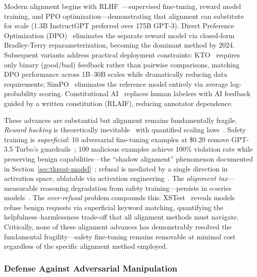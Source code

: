 Modern alignment begins with RLHF~\cite{ouyang2022rlhf}---supervised fine-tuning, reward model training, and PPO optimization---demonstrating that alignment can substitute for scale (1.3B InstructGPT preferred over 175B GPT-3). Direct Preference Optimization (DPO)~\cite{rafailov2023dpo} eliminates the separate reward model via closed-form Bradley-Terry reparameterization, becoming the dominant method by 2024. Subsequent variants address practical deployment constraints: KTO~\cite{ethayarajh2024kto} requires only binary (good/bad) feedback rather than pairwise comparisons, matching DPO performance across 1B--30B scales while dramatically reducing data requirements; SimPO~\cite{meng2024simpo} eliminates the reference model entirely via average log-probability scoring. Constitutional AI~\cite{bai2022constitutionalai} replaces human labelers with AI feedback guided by a written constitution (RLAIF), reducing annotator dependence.

These advances are substantial but alignment remains fundamentally fragile. \emph{Reward hacking} is theoretically inevitable~\cite{skalse2022rewardhacking} with quantified scaling laws~\cite{gao2023scalinglaws}. Safety training is \emph{superficial}: 10 adversarial fine-tuning examples at \$0.20 remove GPT-3.5 Turbo's guardrails~\cite{qi2024finetuning}; 100 malicious examples achieve 100\% violation rate while preserving benign capabilities---the ``shadow alignment'' phenomenon documented in Section~\ref{sec:threat-model}~\cite{yang2023shadow}; refusal is mediated by a single direction in activation space, ablatable via activation engineering~\cite{arditi2024refusal}. The \emph{alignment tax}---measurable reasoning degradation from safety training---persists in o-series models~\cite{huang2025safetytax}. The \emph{over-refusal} problem compounds this: XSTest~\cite{rottger2024xstest} reveals models refuse benign requests via superficial keyword matching, quantifying the helpfulness--harmlessness trade-off that all alignment methods must navigate. Critically, none of these alignment advances has demonstrably resolved the fundamental fragility---safety fine-tuning remains removable at minimal cost regardless of the specific alignment method employed.


\subsubsection{Defense Against Adversarial Manipulation}
\label{sec:defense}

